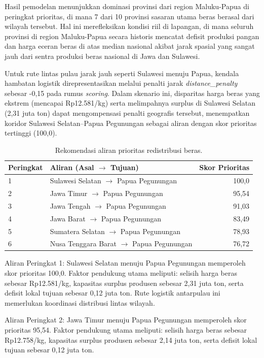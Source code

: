 \documentclass[journal, a4paper]{IEEEtran}
\begin{document}
Hasil pemodelan menunjukkan dominasi provinsi dari region Maluku-Papua di peringkat prioritas, di mana 7 dari 10 provinsi sasaran utama beras berasal dari wilayah tersebut. Hal ini merefleksikan kondisi riil di lapangan, di mana seluruh provinsi di region Maluku-Papua secara historis mencatat defisit produksi pangan dan harga eceran beras di atas median nasional akibat jarak spasial yang sangat jauh dari sentra produksi beras nasional di Jawa dan Sulawesi.

Untuk rute lintas pulau jarak jauh seperti Sulawesi menuju Papua, kendala hambatan logistik direpresentasikan melalui penalti jarak \textit{distance\_penalty} sebesar -0,15 pada rumus \textit{scoring}. Dalam skenario ini, disparitas harga beras yang ekstrem (mencapai Rp12.581/kg) serta melimpahnya surplus di Sulawesi Selatan (2,31 juta ton) dapat mengompensasi penalti geografis tersebut, menempatkan koridor Sulawesi Selatan--Papua Pegunungan sebagai aliran dengan skor prioritas tertinggi (100,0).

\begin{table}[H]
  \footnotesize
  \caption{Rekomendasi aliran prioritas redistribusi beras.}
  \label{tab:flows}
  \begin{tabular}{l l r}
    \toprule
    Peringkat & Aliran (Asal $\to$ Tujuan) & Skor Prioritas \\
    \midrule
    1 & Sulawesi Selatan $\to$ Papua Pegunungan & 100,0 \\
    2 & Jawa Timur $\to$ Papua Pegunungan & 95,54 \\
    3 & Jawa Tengah $\to$ Papua Pegunungan & 91,03 \\
    4 & Jawa Barat $\to$ Papua Pegunungan & 83,49 \\
    5 & Sumatera Selatan $\to$ Papua Pegunungan & 78,93 \\
    6 & Nusa Tenggara Barat $\to$ Papua Pegunungan & 76,72 \\
    \bottomrule
  \end{tabular}
\end{table}

Aliran Peringkat 1: Sulawesi Selatan menuju Papua Pegunungan memperoleh skor prioritas 100,0. Faktor pendukung utama meliputi: selisih harga beras sebesar Rp12.581/kg, kapasitas surplus produsen sebesar 2,31 juta ton, serta defisit lokal tujuan sebesar 0,12 juta ton. Rute logistik antarpulau ini memerlukan koordinasi distribusi lintas wilayah.

Aliran Peringkat 2: Jawa Timur menuju Papua Pegunungan memperoleh skor prioritas 95,54. Faktor pendukung utama meliputi: selisih harga beras sebesar Rp12.758/kg, kapasitas surplus produsen sebesar 2,14 juta ton, serta defisit lokal tujuan sebesar 0,12 juta ton.
\end{document}
